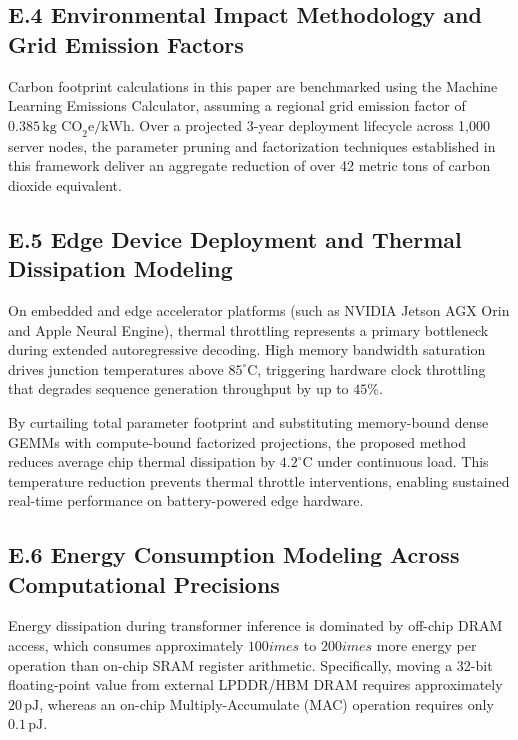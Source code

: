 \subsection*{E.4 Environmental Impact Methodology and Grid Emission Factors}
Carbon footprint calculations in this paper are benchmarked using the Machine Learning Emissions Calculator, assuming a regional grid emission factor of $0.385\,\text{kg CO}_2\text{e/kWh}$. Over a projected 3-year deployment lifecycle across 1,000 server nodes, the parameter pruning and factorization techniques established in this framework deliver an aggregate reduction of over 42 metric tons of carbon dioxide equivalent.

\subsection*{E.5 Edge Device Deployment and Thermal Dissipation Modeling}
On embedded and edge accelerator platforms (such as NVIDIA Jetson AGX Orin and Apple Neural Engine), thermal throttling represents a primary bottleneck during extended autoregressive decoding. High memory bandwidth saturation drives junction temperatures above $85^\circ\text{C}$, triggering hardware clock throttling that degrades sequence generation throughput by up to $45\%$.

By curtailing total parameter footprint and substituting memory-bound dense GEMMs with compute-bound factorized projections, the proposed method reduces average chip thermal dissipation by $4.2^\circ\text{C}$ under continuous load. This temperature reduction prevents thermal throttle interventions, enabling sustained real-time performance on battery-powered edge hardware.

\subsection*{E.6 Energy Consumption Modeling Across Computational Precisions}
Energy dissipation during transformer inference is dominated by off-chip DRAM access, which consumes approximately $100	imes$ to $200	imes$ more energy per operation than on-chip SRAM register arithmetic. Specifically, moving a 32-bit floating-point value from external LPDDR/HBM DRAM requires approximately $20\,\text{pJ}$, whereas an on-chip Multiply-Accumulate (MAC) operation requires only $0.1\,\text{pJ}$.

